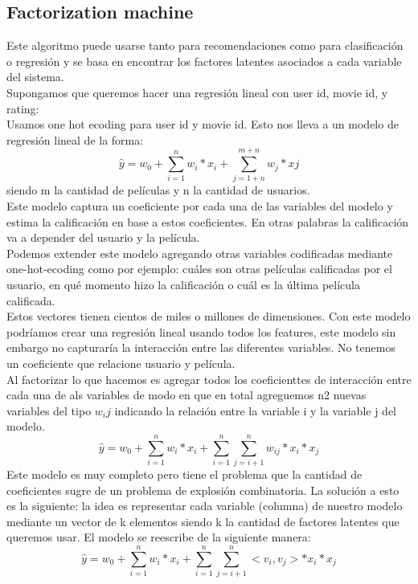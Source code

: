 \documentclass[titlepage,a4paper]{article}
\begin{document}
\subsection*{Factorization machine}
Este algoritmo puede usarse tanto para recomendaciones como para clasificación o regresión y se basa en encontrar los factores latentes asociados a cada variable del sistema. \\

Supongamos que queremos hacer una regresión lineal con user id, movie id, y rating: \\

Usamos one hot ecoding para user id y movie id. Esto nos lleva a un modelo de regresión lineal de la forma: $$\widehat{y} = w_0 + \sum_{i=1}^n w_i*x_i + \sum_{j=1+n}^{m+n} w_j*xj $$ siendo m la cantidad de películas y n la cantidad de usuarios. \\

Este modelo captura un coeficiente por cada una de las variables del modelo y estima la calificación en base a estos coeficientes. En otras palabras la calificación va a depender del usuario y la película. \\

Podemos extender este modelo agregando otras variables codificadas mediante one-hot-ecoding como por ejemplo: cuáles son otras películas calificadas por el usuario, en qué momento hizo la calificación o cuál es la última película calificada. \\

Estos vectores tienen cientos de miles o millones de dimensiones. Con este modelo podríamos crear una regresión lineal usando todos los features, este modelo sin embargo no capturaría la interacción entre las diferentes variables. No tenemos un coeficiente que relacione usuario y película. \\

Al factorizar lo que hacemos es agregar todos los coeficienttes de interacción entre cada una de als variables de modo en que en total agreguemos n2 nuevas variables del tipo $w_ij$ indicando la relación entre la variable i y la variable j del modelo. $$\widehat{y} = w_0 + \sum_{i=1}^n w_i*x_i + \sum_{i=1}^n \sum_{j=i+1}^n w_{ij}* x_i * x_j$$  
Este modelo es muy completo pero tiene el problema que la cantidad de coeficientes sugre de un problema de explosión combinatoria. La solución a esto es la siguiente: la idea es representar cada variable (columna) de nuestro modelo mediante un vector de k elementos siendo k la cantidad de factores latentes que queremos usar. El modelo se reescribe de la siguiente manera:  $$\widehat{y} = w_0 + \sum_{i=1}^n w_i*x_i + \sum_{i=1}^n \sum_{j=i+1}^n <v_i, v_j>* x_i * x_j$$  
\end{document}
